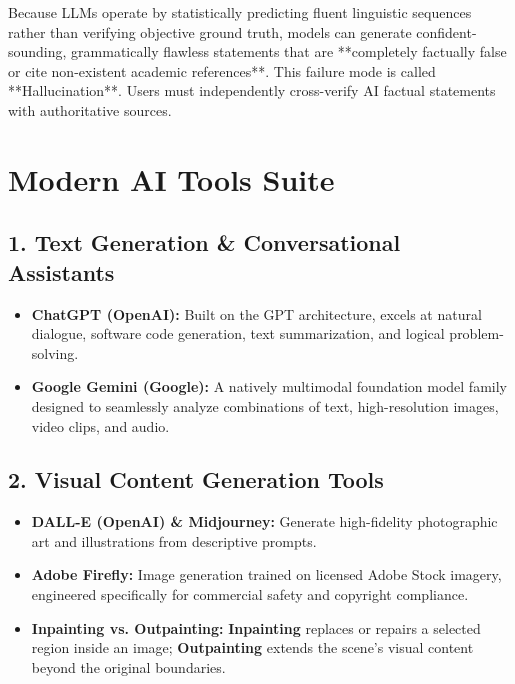 \begin{examalert}
Because LLMs operate by statistically predicting fluent linguistic sequences rather than verifying objective ground truth, models can generate confident-sounding, grammatically flawless statements that are **completely factually false or cite non-existent academic references**. This failure mode is called **Hallucination**. Users must independently cross-verify AI factual statements with authoritative sources.
\end{examalert}

\section{Modern AI Tools Suite}

\subsection{1. Text Generation \& Conversational Assistants}
\begin{itemize}[leftmargin=1.2em]
    \item \textbf{ChatGPT (OpenAI):} Built on the GPT architecture, excels at natural dialogue, software code generation, text summarization, and logical problem-solving.
    \item \textbf{Google Gemini (Google):} A natively multimodal foundation model family designed to seamlessly analyze combinations of text, high-resolution images, video clips, and audio.
\end{itemize}

\subsection{2. Visual Content Generation Tools}
\begin{itemize}[leftmargin=1.2em]
    \item \textbf{DALL-E (OpenAI) \& Midjourney:} Generate high-fidelity photographic art and illustrations from descriptive prompts.
    \item \textbf{Adobe Firefly:} Image generation trained on licensed Adobe Stock imagery, engineered specifically for commercial safety and copyright compliance.
    \item \textbf{Inpainting vs. Outpainting:} \textbf{Inpainting} replaces or repairs a selected region inside an image; \textbf{Outpainting} extends the scene's visual content beyond the original boundaries.
\end{itemize}

